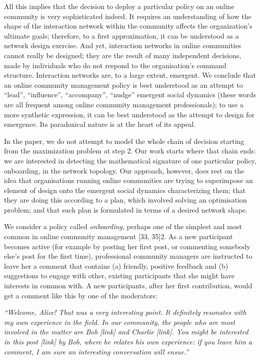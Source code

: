All this implies that the decision to deploy a particular policy on an online community is very sophisticated indeed. It requires an understanding of how the shape of the interaction network within the community affects the organization's ultimate goals; therefore, to a first approximation, it can be understood as a network design exercise. And yet, interaction networks in online communities cannot really be designed; they are the result of many independent decisions, made by individuals who do not respond to the organisation's command structure. Interaction networks are, to a large extent, emergent. We conclude that an online community management policy is best understood as an attempt to “lead”, “influence”, “accompany”, “nudge” emergent social dynamics (these words are all  frequent among online community management professionals); to use a more synthetic expression, it can be best understood as the attempt to design for emergence. Its paradoxical nature is at the heart of its appeal. 

In the paper, we do not attempt to model the whole chain of decision starting from the maximization problem at step 2. Our work starts where that chain ends: we are interested in detecting the mathematical signature of one particular policy, onboarding, in the network topology. Our approach, however, does rest on the idea that organisations running online communities are trying to superimpose an element of design onto the emergent social dynamics characterizing them; that they are doing this according to a plan, which involved solving an optimisation problem; and that such plan is formulated in terms of a desired network shape. 

We consider a policy called \emph{onboarding}, perhaps one of the simplest and most common in online community management [33, 35]2. As a new participant becomes active (for example by posting her first post, or commenting somebody else’s post for the first time), professional community managers are instructed to leave her a comment that contains (a) friendly, positive feedback and (b) suggestions to engage with other, existing participants that she might have interests in common with. A new participants, after her first contribution, would get a comment like this by one of the moderators:

\emph{``Welcome, Alice! That was a very interesting point. It definitely resonates with my own experience in the field. In our community, the people who are most involved in the matter are Bob [link] and Charlie [link]. You might be interested in this post [link] by Bob, where he relates his own experience: if you leave him a comment, I am sure an interesting conversation will ensue.''}

